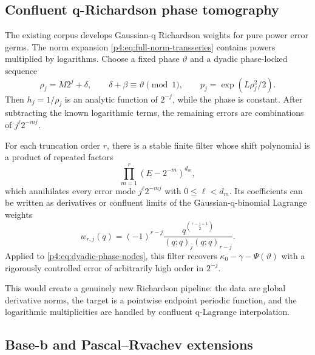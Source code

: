 \documentclass[11pt,oneside]{article}
\theoremstyle{definition}
\theoremstyle{remark}
\begin{document}
\subsection{Confluent q-Richardson phase tomography}

The existing corpus develops Gaussian-q Richardson weights for pure power error germs.
The norm expansion \eqref{p4:eq:full-norm-transseries} contains powers multiplied by logarithms.
Choose a fixed phase $\vartheta$ and a dyadic phase-locked sequence
\begin{equation}
 \rho_j=M2^j+\delta,
 \qquad
 \delta+\beta\equiv\vartheta\pmod1,
 \qquad
 p_j=\exp(L\rho_j^2/2).
 \label{p4:eq:dyadic-phase-nodes}
\end{equation}
Then $h_j=1/\rho_j$ is an analytic function of $2^{-j}$, while the phase is constant.
After subtracting the known logarithmic terms, the remaining errors are combinations of
$j^\ell2^{-mj}$.

\begin{conjecture}
\label{p4:conj:confluent-q-filter}
For each truncation order $r$, there is a stable finite filter whose shift polynomial is a
product of repeated factors
\begin{equation}
 \prod_{m=1}^{r}(E-2^{-m})^{d_m},
 \label{p4:eq:confluent-shift-polynomial}
\end{equation}
which annihilates every error mode $j^\ell2^{-mj}$ with
$0\leq\ell<d_m$.  Its coefficients can be written as derivatives or confluent limits of the
Gaussian-q-binomial Lagrange weights
\begin{equation}
 w_{r,j}(q)=(-1)^{r-j}
 \frac{q^{\binom{r-j+1}{2}}}{(q;q)_j(q;q)_{r-j}}.
 \label{p4:eq:q-Richardson-weights}
\end{equation}
Applied to \eqref{p4:eq:dyadic-phase-nodes}, this filter recovers
$\kappa_0-\gamma-\Psi(\vartheta)$ with a rigorously controlled error of arbitrarily high
order in $2^{-j}$.
\end{conjecture}

This would create a genuinely new Richardson pipeline: the data are global derivative norms,
the target is a pointwise endpoint periodic function, and the logarithmic multiplicities are
handled by confluent q-Lagrange interpolation.

\subsection{Base-b and Pascal--Rvachev extensions}
\end{document}
